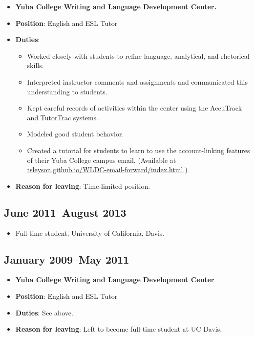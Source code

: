 \documentclass[12pt]{article}
\begin{document}
\begin{itemize}
\item \textbf{Yuba College Writing and Language Development Center.}
\item \textbf{Position}: English and ESL Tutor
\item \textbf{Duties}:
\begin{itemize}
\item Worked closely with students to refine language, analytical, and 
      rhetorical skills.
\item Interpreted instructor comments and assignments and communicated
      this understanding to students.
\item Kept careful records of activities within the center using the
      AccuTrack and TutorTrac systems.
\item Modeled good student behavior.
\item Created a tutorial for students to learn to use the 
      account-linking features of their Yuba College campus email.
      (Available at \href{http://tsleyson.github.io/WLDC-email-forward/index.html}{tsleyson.github.io/WLDC-email-forward/index.html}.)
\end{itemize}
\item \textbf{Reason for leaving}: Time-limited position.
\end{itemize}
\subsection*{June 2011–August 2013}
\label{sec-5-2}

\begin{itemize}
\item Full-time student, University of California, Davis.
\end{itemize}
\subsection*{January 2009–May 2011}
\label{sec-5-3}

\begin{itemize}
\item \textbf{Yuba College Writing and Language Development Center}
\item \textbf{Position}: English and ESL Tutor
\item \textbf{Duties}: See above.
\item \textbf{Reason for leaving}: Left to become full-time student at UC Davis.
\end{itemize}
\end{document}
